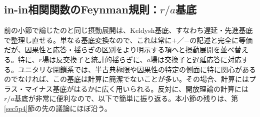 \documentclass[a4paper,11pt,oneside]{article}
\theoremstyle{definition}
\numberwithin{equation}{section}
\begin{document}
\subsection{in-in相関関数のFeynman規則：$r/a$基底}



前の小節で論じたのと同じ摂動展開は、Keldysh基底、すなわち遅延・先進基底で整理し直せる。単なる基底変換なので、これは常に\(+\)／\(-\)の記述と完全に等価だが、因果性と応答・揺らぎの区別をより明示する項へと摂動展開を並べ替える。特に、\(r\)場は反交換子と統計的揺らぎに、\(a\)場は交換子と遅延応答に対応する。ユニタリな閉鎖系では、半古典極限や因果性の特定の側面に特に関心があるのでなければ、この基底は計算に簡潔でないことが多い。その場合、計算にはプラス・マイナス基底がはるかに広く用いられる。反対に、開放理論の計算には$  r/a $基底が非常に便利なので、以下で簡単に振り返る。本小節の残りは、第\ref{sec5p4}節の先の議論にほぼ沿う。
\end{document}
